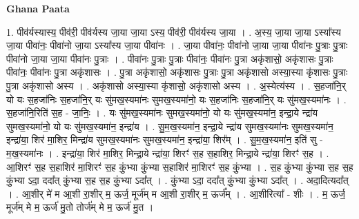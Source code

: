 \documentclass[17pt]{extarticle}
\begin{document}
\textbf{Ghana Paata } \newline

1. पीव॑र्यस्यास्य॒ पीव॑री॒ पीव॑र्यस्य जा॒या जा॒या ऽस्य॒ पीव॑री॒ पीव॑र्यस्य जा॒या । . अ॒स्य॒ जा॒या जा॒या ऽस्या᳚स्य जा॒या पीवा॑नः॒ पीवा॑नो जा॒या ऽस्या᳚स्य जा॒या पीवा॑नः । . जा॒या पीवा॑नः॒ पीवा॑नो जा॒या जा॒या पीवा॑नः पु॒त्राः पु॒त्राः पीवा॑नो जा॒या जा॒या पीवा॑नः पु॒त्राः । . पीवा॑नः पु॒त्राः पु॒त्राः पीवा॑नः॒ पीवा॑नः पु॒त्रा अकृ॑शासो॒ अकृ॑शासः पु॒त्राः पीवा॑नः॒ पीवा॑नः पु॒त्रा अकृ॑शासः । . पु॒त्रा अकृ॑शासो॒ अकृ॑शासः पु॒त्राः पु॒त्रा अकृ॑शासो अस्या॒स्या कृ॑शासः पु॒त्राः पु॒त्रा अकृ॑शासो अस्य । . अकृ॑शासो अस्या॒स्या कृ॑शासो॒ अकृ॑शासो अस्य । . अ॒स्येत्य॑स्य । . स॒हजा॑नि॒र् यो यः स॒हजा॑निः स॒हजा॑नि॒र् यः सु॑मख॒स्यमा॑नः सुमख॒स्यमा॑नो॒ यः स॒हजा॑निः स॒हजा॑नि॒र् यः सु॑मख॒स्यमा॑नः । . स॒हजा॑नि॒रिति॑ स॒ह - जा॒निः॒ । . यः सु॑मख॒स्यमा॑नः सुमख॒स्यमा॑नो॒ यो यः सु॑मख॒स्यमा॑न॒ इन्द्रा॒ये न्द्रा॑य सुमख॒स्यमा॑नो॒ यो यः सु॑मख॒स्यमा॑न॒ इन्द्रा॑य । . सु॒म॒ख॒स्यमा॑न॒ इन्द्रा॒ये न्द्रा॑य सुमख॒स्यमा॑नः सुमख॒स्यमा॑न॒ इन्द्रा॑या॒ शिर॑ मा॒शिर॒ मिन्द्रा॑य सुमख॒स्यमा॑नः सुमख॒स्यमा॑न॒ इन्द्रा॑या॒ शिर᳚म् । . सु॒म॒ख॒स्यमा॑न॒ इति॑ सु - म॒ख॒स्यमा॑नः । . इन्द्रा॑या॒ शिर॑ मा॒शिर॒ मिन्द्रा॒ये न्द्रा॑या॒ शिरꣳ॑ स॒ह स॒हाशिर॒ मिन्द्रा॒ये न्द्रा॑या॒ शिरꣳ॑ स॒ह । . आ॒शिरꣳ॑ स॒ह स॒हाशिर॑ मा॒शिरꣳ॑ स॒ह कुं॒भ्या कुं॒भ्या स॒हाशिर॑ मा॒शिरꣳ॑ स॒ह कुं॒भ्या । . स॒ह कुं॒भ्या कुं॒भ्या स॒ह स॒ह कुं॒भ्या ऽदा॒ ददा᳚त् कुं॒भ्या स॒ह स॒ह कुं॒भ्या ऽदा᳚त् । . कुं॒भ्या ऽदा॒ ददा᳚त् कुं॒भ्या कुं॒भ्या ऽदा᳚त् । . अदा॒दित्यदा᳚त् । . आ॒शीर् मे॑ म आ॒शी रा॒शीर् म॒ ऊर्ज॒ मूर्ज॑म् म आ॒शी रा॒शीर् म॒ ऊर्ज᳚म् । . आ॒शीरित्या᳚ - शीः । . म॒ ऊर्ज॒ मूर्ज॑म् मे म॒ ऊर्ज॑ मु॒तो तोर्ज॑म् मे म॒ ऊर्ज॑ मु॒त । \newline
\end{document}
